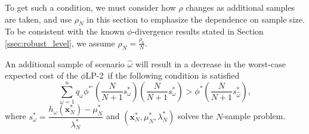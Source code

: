 \documentclass[ijoc,letterpaper]{informs3} %
\newcommand{\x}{\mathbf{x}}
\newcommand{\plp}{$\phi$LP-2}
\begin{document}
To get such a condition, we must consider how $\rho$ changes as additional samples are taken, and use $\rho_N$ in this section to emphasize the dependence on sample size.
To be consistent with the known $\phi$-divergence results stated in Section \ref{ssec:robust_level}, we assume $\rho_N = \frac{\rho_0}{N}$.

\begin{proposition}
	An additional sample of scenario $\hat{\omega}$ will result in a decrease in the worst-case expected cost of the \plp\ if the following condition is satisfied
	\begin{equation} \label{eq:cost_decrease_cond}
		\sum_{\omega=1}^n q_\omega \phi^{*\prime}\left(\frac{N}{N+1}s^*_\omega\right) \left(\frac{N}{N+1}s^*_\omega\right) > \phi^*\left(\frac{N}{N+1}s^*_{\hat{\omega}}\right),
	\end{equation}
	where $s^*_\omega = \dfrac{h_\omega(\x^*_N) - \mu^*_N}{\lambda^*_N}$ and $(\x^*_N,\mu^*_N,\lambda^*_N)$ solves the $N$-sample problem.
\end{proposition}
\end{document}
